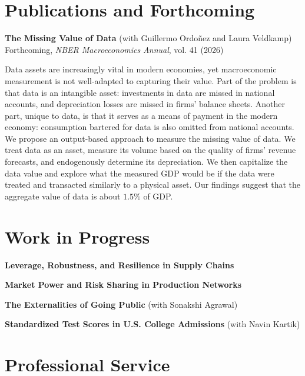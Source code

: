 \documentclass[11pt]{article}
\begin{document}
\section*{Publications and Forthcoming}

\textbf{The Missing Value of Data} (with Guillermo Ordoñez and Laura Veldkamp) \\
Forthcoming, \textit{NBER Macroeconomics Annual}, vol. 41 (2026)

Data assets are increasingly vital in modern economies, yet macroeconomic measurement is not well-adapted to capturing their value. Part of the problem is that data is an intangible asset: investments in data are missed in national accounts, and depreciation losses are missed in firms' balance sheets. Another part, unique to data, is that it serves as a means of payment in the modern economy: consumption bartered for data is also omitted from national accounts. We propose an output-based approach to measure the missing value of data. We treat data as an asset, measure its volume based on the quality of firms' revenue forecasts, and endogenously determine its depreciation. We then capitalize the data value and explore what the measured GDP would be if the data were treated and transacted similarly to a physical asset. Our findings suggest that the aggregate value of data is about $1.5\%$ of GDP.

\section*{Work in Progress}

\textbf{Leverage, Robustness, and Resilience in Supply Chains}

\vspace{0.2cm}

\textbf{Market Power and Risk Sharing in Production Networks}

\vspace{0.2cm}

\textbf{The Externalities of Going Public} (with Sonakshi Agrawal)

\vspace{0.2cm}

\textbf{Standardized Test Scores in U.S. College Admissions} (with Navin Kartik)

\section*{Professional Service}
\end{document}
